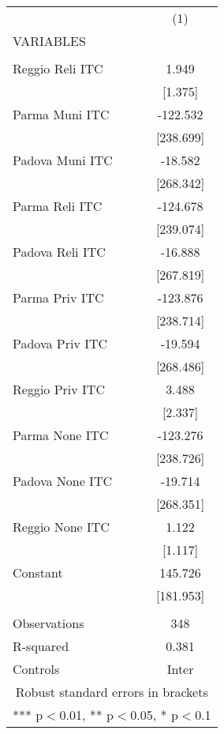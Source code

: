 \begin{tabular}{lc} \hline
 & (1) \\
VARIABLES &  \\ \hline
 &  \\
Reggio Reli ITC & 1.949 \\
 & [1.375] \\
Parma Muni ITC & -122.532 \\
 & [238.699] \\
Padova Muni ITC & -18.582 \\
 & [268.342] \\
Parma Reli ITC & -124.678 \\
 & [239.074] \\
Padova Reli ITC & -16.888 \\
 & [267.819] \\
Parma Priv ITC & -123.876 \\
 & [238.714] \\
Padova Priv ITC & -19.594 \\
 & [268.486] \\
Reggio Priv ITC & 3.488 \\
 & [2.337] \\
Parma None ITC & -123.276 \\
 & [238.726] \\
Padova None ITC & -19.714 \\
 & [268.351] \\
Reggio None ITC & 1.122 \\
 & [1.117] \\
Constant & 145.726 \\
 & [181.953] \\
 &  \\
Observations & 348 \\
R-squared & 0.381 \\
 Controls & Inter \\ \hline
\multicolumn{2}{c}{ Robust standard errors in brackets} \\
\multicolumn{2}{c}{ *** p$<$0.01, ** p$<$0.05, * p$<$0.1} \\
\end{tabular}
